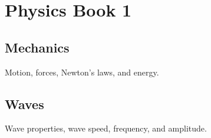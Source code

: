 \chapter{Physics Book 1}

\section{Mechanics}
Motion, forces, Newton's laws, and energy.

\section{Waves}
Wave properties, wave speed, frequency, and amplitude.
